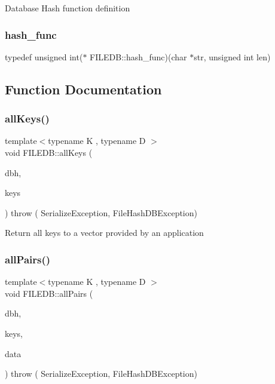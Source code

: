 Database Hash function definition \mbox{\label{namespaceFILEDB_a9e945e165dd500023ad29b4fcb2332b8}} 
\subsubsection{\texorpdfstring{hash\_func}{hash\_func}}
{\footnotesize\ttfamily typedef unsigned int($\ast$ F\+I\+L\+E\+D\+B\+::hash\+\_\+func)(char $\ast$str, unsigned int len)}



\subsection{Function Documentation}
\mbox{\label{namespaceFILEDB_a3d87ecce7111516944b8b8e532aad4ea}} 
\subsubsection{\texorpdfstring{allKeys()}{allKeys()}}
{\footnotesize\ttfamily template$<$typename K , typename D $>$ \\
void F\+I\+L\+E\+D\+B\+::all\+Keys (\begin{DoxyParamCaption}\item[{\mbox{\hyperlink{adat-devel_2other__libs_2filedb_2filehash_2ffdb__db_8h_a0b27b956926453a7a8141ea8e10f0df8}{F\+F\+D\+B\+\_\+\+DB}} $\ast$}]{dbh,  }\item[{std\+::vector$<$ K $>$ \&}]{keys }\end{DoxyParamCaption}) throw ( Serialize\+Exception, File\+Hash\+D\+B\+Exception) }

Return all keys to a vector provided by an application \mbox{\label{namespaceFILEDB_a94222bc861d65f1c5f139529a5643cd4}} 
\subsubsection{\texorpdfstring{allPairs()}{allPairs()}}
{\footnotesize\ttfamily template$<$typename K , typename D $>$ \\
void F\+I\+L\+E\+D\+B\+::all\+Pairs (\begin{DoxyParamCaption}\item[{\mbox{\hyperlink{adat-devel_2other__libs_2filedb_2filehash_2ffdb__db_8h_a0b27b956926453a7a8141ea8e10f0df8}{F\+F\+D\+B\+\_\+\+DB}} $\ast$}]{dbh,  }\item[{std\+::vector$<$ K $>$ \&}]{keys,  }\item[{std\+::vector$<$ D $>$ \&}]{data }\end{DoxyParamCaption}) throw ( Serialize\+Exception, File\+Hash\+D\+B\+Exception) }

